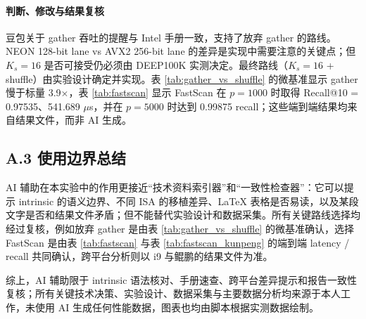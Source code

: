 \documentclass[a4paper,11pt,UTF8]{ctexart}
\begin{document}
\paragraph{判断、修改与结果复核}

豆包关于 gather 吞吐的提醒与 Intel 手册一致，支持了放弃 gather 的路线。NEON 128-bit lane vs AVX2 256-bit lane 的差异是实现中需要注意的关键点；但 $K_s=16$ 是否可接受仍必须由 DEEP100K 实测决定。最终路线（$K_s=16$ + shuffle）由实验设计确定并实现。表 \ref{tab:gather_vs_shuffle} 的微基准显示 gather 慢于标量 3.9$\times$，表 \ref{tab:fastscan} 显示 FastScan 在 $p=1000$ 时取得 Recall@10 = 0.97535、541.689 $\mu$s，并在 $p=5000$ 时达到 0.99875 recall；这些端到端结果均来自结果文件，而非 AI 生成。

\medskip
\subsection*{A.3 使用边界总结}

AI 辅助在本实验中的作用更接近``技术资料索引器''和``一致性检查器''：它可以提示 intrinsic 的语义边界、不同 ISA 的移植差异、LaTeX{} 表格是否易读，以及某段文字是否和结果文件矛盾；但不能替代实验设计和数据采集。所有关键路线选择均经过复核，例如放弃 gather 是由表 \ref{tab:gather_vs_shuffle} 的微基准确认，选择 FastScan 是由表 \ref{tab:fastscan} 与表 \ref{tab:fastscan_kunpeng} 的端到端 latency / recall 共同确认，跨平台分析则以 i9 与鲲鹏的结果文件为准。

\noindent 综上，AI 辅助限于 intrinsic 语法核对、手册速查、跨平台差异提示和报告一致性复核；所有关键技术决策、实验设计、数据采集与主要数据分析均来源于本人工作，未使用 AI 生成任何性能数据，图表也均由脚本根据实测数据绘制。

\clearpage
\setcounter{page}{1}
\renewcommand{\thepage}{R-\arabic{page}}
\cfoot{\thepage}


\end{document}
